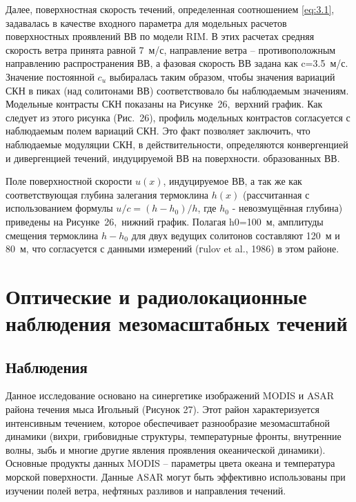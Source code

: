 Далее, поверхностная скорость течений, определенная соотношением \eqref{eq:3.1}, задавалась в качестве входного параметра для модельных расчетов поверхностных проявлений ВВ по модели RIM. В этих расчетах средняя скорость ветра принята равной 7~м/с, направление ветра -- противоположным направлению распространения ВВ, а фазовая скорость ВВ задана как c=3.5~м/с. Значение постоянной $c_{u} $ выбиралась таким образом, чтобы значения вариаций СКН в пиках (над солитонами ВВ) соответствовало бы наблюдаемым значениям. Модельные контрасты СКН показаны на Рисунке~26,~верхний график. Как следует из этого рисунка (Рис.~26), профиль модельных контрастов согласуется с наблюдаемым полем вариаций СКН. Это факт позволяет заключить, что наблюдаемые модуляции СКН, в действительности, определяются конвергенцией и дивергенцией течений, индуцируемой ВВ на поверхности. образованных ВВ.

Поле поверхностной скорости $u(x)$, индуцируемое ВВ, а так же как соответствующая глубина залегания термоклина $h(x)$ (рассчитанная с использованием формулы $u/c=(h-h_{0} )/h$, где $h_{0} $ - невозмущённая глубина) приведены на Рисунке~26,~нижний график. Полагая h0=100~м, амплитуды смещения термоклина $h-h_{0} $ для двух ведущих солитонов составляют 120~м и 80~м, что согласуется с данными измерений (гulov et al., 1986) в этом районе.



\section{Оптические и радиолокационные наблюдения мезомасштабных течений} \label{sec:3.2}



\subsection{Наблюдения} \label{sec:3.2.1}

Данное исследование основано на синергетике изображений MODIS и ASAR района течения мыса Игольный (Рисунок 27). Этот район характеризуется интенсивным течением, которое обеспечивает разнообразие мезомасштабной динамики (вихри, грибовидные структуры, температурные фронты, внутренние волны, зыбь и многие другие явления проявления океанической динамики). Основные продукты данных MODIS -- параметры цвета океана и температура морской поверхности. Данные ASAR могут быть эффективно использованы при изучении полей ветра, нефтяных разливов и направления течений.

